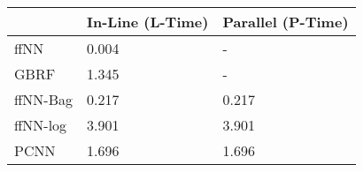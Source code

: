 \begin{tabular}{lll}
\toprule
{} & In-Line (L-Time) & Parallel (P-Time) \\
\midrule
ffNN     &            0.004 &                 - \\
GBRF     &            1.345 &                 - \\
ffNN-Bag &            0.217 &             0.217 \\
ffNN-log &            3.901 &             3.901 \\
PCNN     &            1.696 &             1.696 \\
\bottomrule
\end{tabular}
